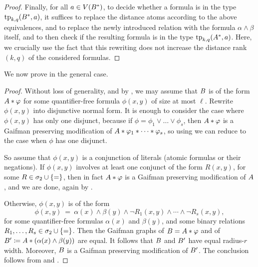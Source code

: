 \begin{proof}
    Finally, for all $a\in V({{B}}^*)$,
    to decide whether a formula is in the type $\textnormal{tp}_{k,q}(B^*,a)$,
    it suffices to replace the
    distance atoms according to the above equivalences, and to replace the newly introduced relation with the formula \(\alpha \land \beta\) itself,
    and to then check if the resulting formula is in the type $\textnormal{tp}_{k,q}(A^*,a)$.
    Here, we crucially use the fact that this rewriting does not increase the distance rank $(k,q)$ of the considered formulas.
\end{proof}








We now prove  in the general case.
\begin{proof}
    




Without loss of generality, and by ,
we may assume that ${{B}}$ is of the form ${{A}}\ast\varphi$ for some 
quantifier-free formula $\phi(x,y)$ of size at most $\ell$.
Rewrite $\phi(x,y)$ into disjunctive normal form.
It is enough to consider the case where $\phi(x,y)$ has only one disjunct,
because if $\phi=\phi_1\lor\ldots\lor\phi_s$, 
then  ${{A}}\ast \varphi$ is a Gaifman preserving modification of 
${{A}}\ast\varphi_1\ast\cdots\ast\varphi_{s}$, 
so  using  we can reduce to the case when $\phi$ has one disjunct.

So assume that $\phi(x,y)$ is a conjunction of literals (atomic formulas or their negations).
If $\phi(x,y)$ involves at least one conjunct of the form $R(x,y)$, for some $R\in\sigma_2\cup\{=\}$, 
then in fact ${{A}}\ast\varphi$ is a Gaifman preserving modification of ${{A}}$,
and we are done, again by .

Otherwise, 
 $\phi(x,y)$ is of the form 
$$\phi(x,y)\ =\ \alpha(x)\land\beta(y)\land \neg R_1(x,y)\land \cdots\land \neg R_s(x,y),$$
for some 
quantifier-free formulas $\alpha(x)$ and $\beta(y)$,
and some binary relations $R_1,\ldots,R_s\in\sigma_2\cup\{=\}$.
Then the Gaifman graphs of ${{B}}={{A}}\ast \varphi$ and of
${{B}}'\coloneqq {{A}}\ast (\alpha(x)\land\beta (y))$ are equal.
It follows that ${{B}}$ and ${{B}}'$ have equal radius-$r$ width.
Moreover, ${{B}}$ is a Gaifman preserving modification of ${{B}}'$.
The conclusion follows from  and .
\end{proof}

